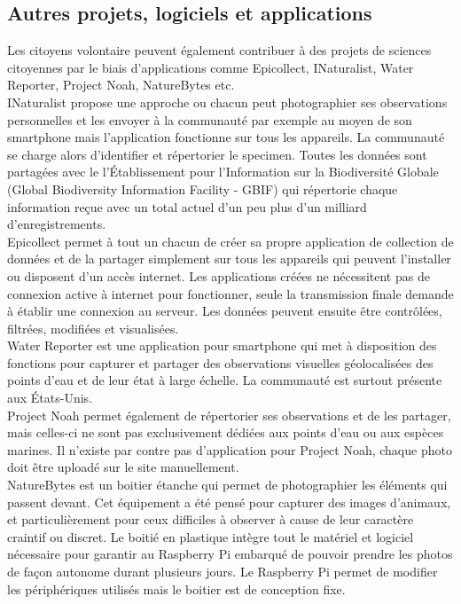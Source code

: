 \documentclass[10pt, article]{llncs}
\begin{document}
	\subsection{Autres projets, logiciels et applications}
		Les citoyens volontaire peuvent également contribuer à des projets de sciences citoyennes par le biais d'applications comme Epicollect, INaturalist, Water Reporter, Project Noah, NatureBytes etc.\\
		INaturalist propose une approche ou chacun peut photographier ses observations personnelles et les envoyer à la communauté par exemple au moyen de son smartphone mais l'application fonctionne sur tous les appareils. La communauté se charge alors d'identifier et répertorier le specimen. Toutes les données sont partagées avec le l'Établissement pour l'Information sur la Biodiversité Globale (Global Biodiversity Information Facility - GBIF) qui répertorie chaque information reçue avec un total actuel d'un peu plus d'un milliard d'enregistrements.\\
		Epicollect permet à tout un chacun de créer sa propre application de collection de données et de la partager simplement sur tous les appareils qui peuvent l'installer ou disposent d'un accès internet. Les applications créées ne nécessitent pas de connexion active à internet pour fonctionner, seule la transmission finale demande à établir une connexion au serveur. Les données peuvent ensuite être contrôlées, filtrées, modifiées et visualisées. \\
		Water Reporter est une application pour smartphone qui met à disposition des fonctions pour capturer et partager des observations visuelles géolocalisées des points d'eau et de leur état à large échelle. La communauté est surtout présente aux États-Unis.\\
		Project Noah permet également de répertorier ses observations et de les partager, mais celles-ci ne sont pas exclusivement dédiées aux points d'eau ou aux espèces marines. Il n'existe par contre pas d'application pour Project Noah, chaque photo doit être uploadé sur le site manuellement.\\
		NatureBytes est un boitier  étanche qui permet de photographier les éléments qui passent devant. Cet équipement a été pensé pour capturer des images d'animaux, et particulièrement pour ceux difficiles à observer à cause de leur caractère craintif ou discret. Le boitié en plastique intègre tout le matériel et logiciel nécessaire pour garantir au Raspberry Pi embarqué de pouvoir prendre les photos de façon autonome durant plusieurs jours. Le Raspberry Pi permet de modifier les périphériques utilisés mais le boitier est de conception fixe.
\end{document}
